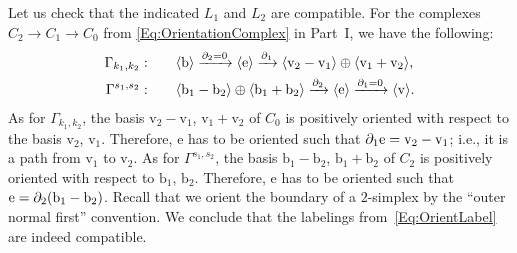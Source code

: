 \documentclass[\MainFolder/Text.tex]{subfiles}
\begin{document}
\begin{Example}
Let us check that the indicated $L_1$ and $L_2$ are compatible. For the complexes $C_2 \rightarrow C_1 \rightarrow C_0$ from \eqref{Eq:OrientationComplex} in Part~I, we have the following:
$$\begin{aligned}
\Gamma_{k_1,k_2}:\qquad &\langle \mathrm{b} \rangle \xrightarrow{\partial_2 = 0}  \langle \mathrm{e} \rangle \xrightarrow{\partial_1} \langle \mathrm{v}_2 - \mathrm{v}_1 \rangle \oplus \langle \mathrm{v}_1 + \mathrm{v}_2 \rangle,  \\
\Gamma^{s_1, s_2}:\qquad &\langle \mathrm{b}_1 - \mathrm{b}_2 \rangle \oplus \langle \mathrm{b}_1 + \mathrm{b}_2 \rangle  \xrightarrow{\partial_2} \langle \mathrm{e} \rangle \xrightarrow{\partial_1 = 0} \langle \mathrm{v} \rangle.  
\end{aligned}$$
As for $\Gamma_{k_1,k_2}$, the basis $\mathrm{v}_2 - \mathrm{v}_1$, $\mathrm{v}_1 + \mathrm{v}_2$ of $C_0$ is positively oriented with respect to the basis $\mathrm{v}_2$, $\mathrm{v}_1$. Therefore, $\mathrm{e}$ has to be oriented such that $\partial_1 \mathrm{e} = \mathrm{v}_2 - \mathrm{v}_1$; i.e., it is a path from $\mathrm{v}_1$ to $\mathrm{v}_2$. As for $\Gamma^{s_1,s_2}$, the basis $\mathrm{b}_1-\mathrm{b}_2$, $\mathrm{b}_1 + \mathrm{b}_2$ of $C_2$ is positively oriented with respect to $\mathrm{b}_1$, $\mathrm{b}_2$. Therefore, $\mathrm{e}$ has to be oriented such that $\mathrm{e} = \partial_2 (\mathrm{b}_1 - \mathrm{b}_2)$. Recall that we orient the boundary of a $2$-simplex by the ``outer normal first'' convention. We conclude that the labelings from~\eqref{Eq:OrientLabel} are indeed compatible.


\end{Example}
\end{document}
